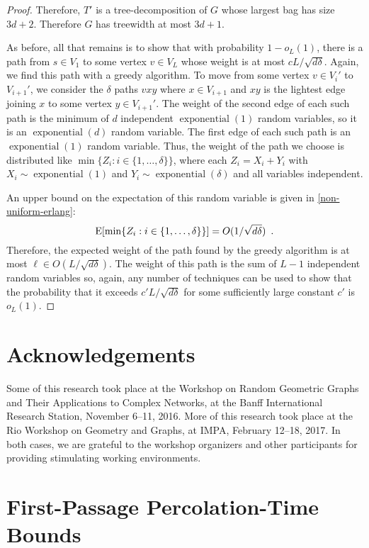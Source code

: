 \documentclass[lotsofwhite]{patmorin}
\DeclareMathOperator{\exponential}{exponential}
\begin{document}
\begin{proof}
  Therefore, $T'$ is a tree-decomposition of $G$ whose largest bag
  has size $3d+2$.  Therefore $G$ has treewidth at most $3d+1$.

  As before, all that remains is to show that with probability $1-o_L(1)$,
  there is a path from $s\in V_1$ to some vertex $v\in V_{L}$ whose
  weight is at most $cL/\sqrt{d\delta}$.  Again, we find this path with a
  greedy algorithm.  To move from some vertex $v\in V_i'$ to $V_{i+1}'$,
  we consider the $\delta$ paths $vxy$ where $x\in V_{i+1}$ and
  $xy$ is the lightest edge joining $x$ to some vertex $y\in V_{i+1}'$.
  The weight of the second edge of each such path is the minimum of
  $d$ independent $\exponential(1)$ random variables, so it is an
  $\exponential(d)$ random variable.  The first edge of each such path
  is an $\exponential(1)$ random variable.  Thus, the weight of the path
  we choose is distributed like $\min\{Z_i:i\in\{1,\ldots,\delta\}\}$,
  where each $Z_i=X_i+Y_i$ with $X_i\sim \exponential(1)$ and
  $Y_i\sim\exponential(\delta)$ and all variables independent.

  An upper bound on the expectation of this random variable is given
  in \eqref{non-uniform-erlang}:
  \[ 
      \mathrm{E}[\min\{Z_i:i\in\{1,\ldots,\delta\}\}] = O(1/\sqrt{d\delta}) \enspace .
  \]
  Therefore, the expected weight of the path found by the greedy
  algorithm is at most $\ell \in O(L/\sqrt{d\delta})$.  The weight of
  this path is the sum of $L-1$ independent random variables so, again,
  any number of techniques can be used to show that the probability that
  it exceeds $c'L/\sqrt{d\delta}$ for some sufficiently large constant
  $c'$ is $o_L(1)$.
\end{proof}

 
\section*{Acknowledgements}

Some of this research took place at the Workshop on Random Geometric
Graphs and Their Applications to Complex Networks, at the Banff
International Research Station, November 6--11, 2016.  More of this
research took place at the Rio Workshop on Geometry and Graphs, at IMPA,
February 12--18, 2017.  In both cases, we are grateful to the workshop
organizers and other participants for providing stimulating working
environments.




\appendix
\section{First-Passage Percolation-Time Bounds}
\end{document}
